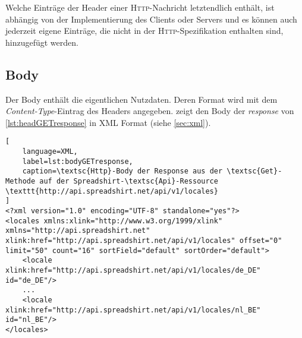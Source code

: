 Welche Einträge der Header einer \textsc{Http}-Nachricht letztendlich enthält, ist abhängig von der Implementierung des Clients oder Servers und es können auch jederzeit eigene Einträge, die nicht in der \textsc{Http}-Spezifikation enthalten sind, hinzugefügt werden.

\subsection{Body}
\label{sec:http-body}

Der Body enthält die eigentlichen Nutzdaten. Deren Format wird mit dem \emph{Content-Type}-Eintrag des Headers angegeben.  zeigt den Body der \emph{response} von \cref{lst:headGETresponse} in \gls{XML} Format (siehe \cref{sec:xml}).

\begin{lstlisting}[
    language=XML,
    label=lst:bodyGETresponse,
    caption=\textsc{Http}-Body der Response aus der \textsc{Get}-Methode auf der Spreadshirt-\textsc{Api}-Ressource \texttt{http://api.spreadshirt.net/api/v1/locales}
]
<?xml version="1.0" encoding="UTF-8" standalone="yes"?>
<locales xmlns:xlink="http://www.w3.org/1999/xlink" xmlns="http://api.spreadshirt.net" xlink:href="http://api.spreadshirt.net/api/v1/locales" offset="0" limit="50" count="16" sortField="default" sortOrder="default">
    <locale xlink:href="http://api.spreadshirt.net/api/v1/locales/de_DE" id="de_DE"/>
    ...
    <locale xlink:href="http://api.spreadshirt.net/api/v1/locales/nl_BE" id="nl_BE"/>
</locales>
\end{lstlisting}

